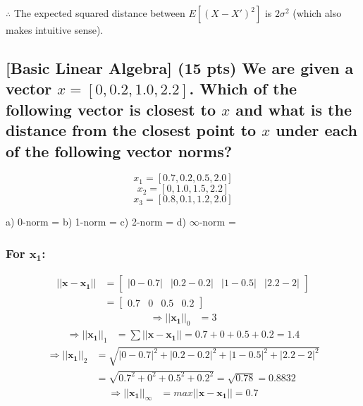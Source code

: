$\therefore$ The expected squared distance between $E[(X-X')^2]$ is $2\sigma^2$ (which also makes intuitive sense).

\subsection{[Basic Linear Algebra] (15 pts) We are given a vector $x = [0, 0.2, 1.0, 2.2]$. Which of the following vector is closest to $x$ and what is the distance from the closest point to $x$ under each of the following vector norms?}

$$x_1 = [0.7, 0.2, 0.5, 2.0]$$
$$x_2 = [0, 1.0, 1.5, 2.2]$$
$$x_3 = [0.8, 0.1, 1.2, 2.0]$$

a) 0-norm =
b) 1-norm =
c) 2-norm =
d) $\infty$-norm =

\subsubsection{For $\mathbf{x_1}$:}
\begin{align}
    ||\mathbf{x} - \mathbf{x_1}|| &= 
    \begin{bmatrix}
        |0 - 0.7| & |0.2 - 0.2| & |1 - 0.5| & |2.2 - 2|
    \end{bmatrix} \nonumber \\
    &= 
    \begin{bmatrix}
        0.7 & 0 & 0.5 & 0.2
    \end{bmatrix} 
\end{align}
\begin{align}
    \Rightarrow ||\mathbf{x_1}||_0 &= 3
\end{align}
\begin{align}
    \Rightarrow  ||\mathbf{x_1}||_1 &= \sum ||\mathbf{x} - \mathbf{x_1}|| = 0.7 + 0 + 0.5 + 0.2 = 1.4
\end{align}
\begin{align}
    \Rightarrow ||\mathbf{x_1}||_2 &= \sqrt{|0 - 0.7|^2 + |0.2 - 0.2|^2 + |1 - 0.5|^2 + |2.2 - 2|^2} \nonumber \\
    &= \sqrt{0.7^2 + 0^2 + 0.5^2 + 0.2^2} = \sqrt{0.78} = 0.8832
\end{align}
\begin{align}
    \Rightarrow ||\mathbf{x_1}||_{\infty} &= max ||\mathbf{x} - \mathbf{x_1}|| = 0.7
\end{align}

